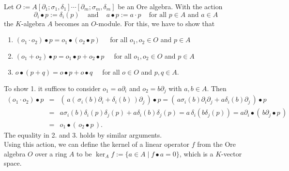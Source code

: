 \documentclass[a4paper,10pt]{article}
\theoremstyle{nonumberplain}
\begin{document}
Let 
$O:=
A[\partial_1; \sigma_1,\delta_1]\cdots[\partial_m; \sigma_m,\delta_m]$ be an Ore algebra.
 With the action
$$
\partial_i \bullet p := \delta_i(p)  \;\;\; \mbox{ and } \;\;\; a \bullet p :=a \cdot p \;\;\; \mbox{ for all } p\in A \mbox{ and } a \in A
$$
the $K$-algebra $A$ becomes an $O$-module. For this, we have to show that 
\begin{enumerate}
 \item $ (o_1 \cdot o_2) \bullet p = o_1 \bullet ( o_2 \bullet p ) \;\;\;\; $ for all $o_1, o_2 \in O$ and $p \in A$ 
 \item $ (o_1 + o_2) \bullet p = o_1 \bullet p +  o_2 \bullet p \;\;\;\; $ for all $o_1, o_2 \in O$ and $p \in A$ 
 \item $ o \bullet (p+q) = o \bullet p + o \bullet q \;\;\;\; $ for all $o \in O$ and $p, q \in A.$ 
\end{enumerate}
To show 1. it suffices to consider $o_1=a \partial_i$ and $o_2= b \partial_j$ with $a, b \in A$. Then
\begin{eqnarray*}
 (o_1 \cdot o_2) \bullet p & = & (\, a( \, \sigma_i(b) \partial_i + \delta_i(b)\,) \partial_j \,) \bullet p 
 =  (\, a\sigma_i(b) \partial_i \partial_j + a\delta_i(b) \partial_j \,) \bullet p \\
& = & a\sigma_i(b) \delta_i(p) \delta_j(p) + a\delta_i(b) \delta_j(p)
 =  a \, \delta_i (b\delta_j(p))
 =  a \partial_i \bullet (\, b \partial_j \bullet p \,)\\
& = &  o_1 \bullet (\, o_2 \bullet p \,).
\end{eqnarray*}
The equality in 2. and 3. holds by similar arguments. \\


Using this action, we can define the kernel of a linear operator $f$ from the Ore algebra $O$ over a ring $A$ to be $\ker_{A} f := \{ a\in A \mid f \bullet a = 0\}$, which is a $K$-vector space.
\end{document}
